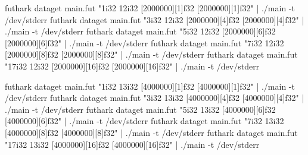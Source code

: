 futhark dataget main.fut "1i32  12i32 [2000000][1]f32  [2000000][1]f32" | ./main -t /dev/stderr
futhark dataget main.fut "3i32  12i32 [2000000][4]f32  [2000000][4]f32" | ./main -t /dev/stderr
futhark dataget main.fut "5i32  12i32 [2000000][6]f32  [2000000][6]f32" | ./main -t /dev/stderr
futhark dataget main.fut "7i32  12i32 [2000000][8]f32  [2000000][8]f32" | ./main -t /dev/stderr
futhark dataget main.fut "17i32 12i32 [2000000][16]f32 [2000000][16]f32" | ./main -t /dev/stderr

futhark dataget main.fut "1i32  13i32 [4000000][1]f32  [4000000][1]f32" | ./main -t /dev/stderr
futhark dataget main.fut "3i32  13i32 [4000000][4]f32  [4000000][4]f32" | ./main -t /dev/stderr
futhark dataget main.fut "5i32  13i32 [4000000][6]f32  [4000000][6]f32" | ./main -t /dev/stderr
futhark dataget main.fut "7i32  13i32 [4000000][8]f32  [4000000][8]f32" | ./main -t /dev/stderr
futhark dataget main.fut "17i32 13i32 [4000000][16]f32 [4000000][16]f32" | ./main -t /dev/stderr

























